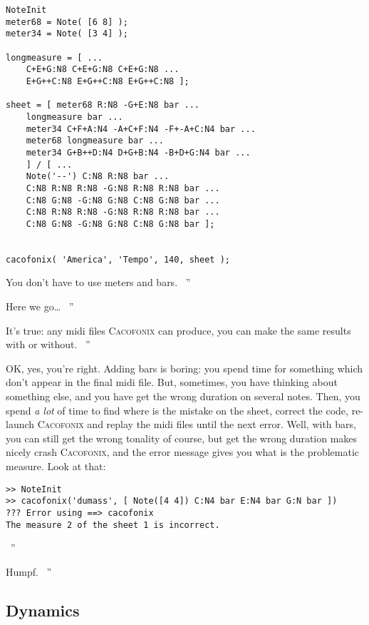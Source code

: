 \documentclass{article}
\newcommand{\cacofonix}{\textsc{Cacofonix}\xspace}
\newenvironment{meenv}{ \par \noindent \makebox[6em][r]{ \textcolor{mecolor}{Me}: `` --~}}{~''}
\newenvironment{myselfenv}{ \par \noindent \makebox[6em][r]{ \textcolor{myselfcolor}{Myself}: `` --~}}{~''}
\newcommand{ \me }[1]{%
\begin{meenv}%
	#1%
\end{meenv} }
\newcommand{ \myself }[1]{%
\begin{myselfenv}%
	#1%
\end{myselfenv} }
\begin{document}

\begin{lstlisting}
NoteInit
meter68 = Note( [6 8] );
meter34 = Note( [3 4] );

longmeasure = [ ...
	C+E+G:N8 C+E+G:N8 C+E+G:N8 ...
	E+G++C:N8 E+G++C:N8 E+G++C:N8 ];

sheet = [ meter68 R:N8 -G+E:N8 bar ...
	longmeasure bar ...
	meter34 C+F+A:N4 -A+C+F:N4 -F+-A+C:N4 bar ...
	meter68 longmeasure bar ...
	meter34 G+B++D:N4 D+G+B:N4 -B+D+G:N4 bar ...
	] / [ ...
	Note('--') C:N8 R:N8 bar ...
	C:N8 R:N8 R:N8 -G:N8 R:N8 R:N8 bar ...
	C:N8 G:N8 -G:N8 G:N8 C:N8 G:N8 bar ...
	C:N8 R:N8 R:N8 -G:N8 R:N8 R:N8 bar ...
	C:N8 G:N8 -G:N8 G:N8 C:N8 G:N8 bar ];
	

cacofonix( 'America', 'Tempo', 140, sheet );
\end{lstlisting}

\me{You don't have to use meters and bars.}
\myself{Here we go\dots}
\me{It's true: any midi files \cacofonix can produce, you can make the same results with or without.}
\begin{myselfenv}%
	OK, yes, you're right. Adding bars is boring: you spend time for something which don't appear in the final midi file. But, sometimes, you have thinking about something else, and you have get the wrong duration on several notes. Then, you spend \emph{a lot} of time to find where is the mistake on the sheet, correct the code, re-launch \cacofonix and replay the midi files until the next error. Well, with bars, you can still get the wrong tonality of course, but get the wrong duration makes nicely crash \cacofonix, and the error message gives you what is the problematic measure. Look at that:
\begin{lstlisting}
>> NoteInit
>> cacofonix('dumass', [ Note([4 4]) C:N4 bar E:N4 bar G:N bar ])
??? Error using ==> cacofonix
The measure 2 of the sheet 1 is incorrect.
\end{lstlisting}%
\end{myselfenv}
\me{Humpf.}

\subsection{Dynamics}
\label{sec:Dynamics}
\end{document}
